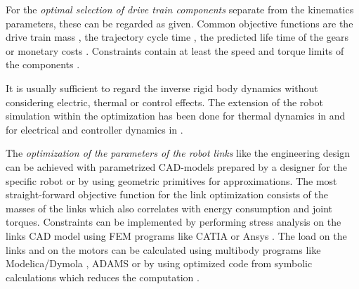 \documentclass{svproc}
\begin{document}
For the \emph{optimal selection of drive train components} separate from the kinematics parameters, these can be regarded as given. %
Common objective functions are the drive train mass \cite{ChedmailGau1990,PetterssonOel2009,ZhouBaiHan2011}, the trajectory cycle time \cite{TarkianPerOelFen2011}, the predicted life time of the gears \cite{PetterssonAndKru2005} or monetary costs \cite{PetterssonAndKru2005}.
Constraints contain at least the speed and torque limits of the components \cite {ChedmailGau1990,PetterssonOel2009,ZhouBaiHan2011}.

It is usually sufficient to regard the inverse rigid body dynamics without considering electric, thermal or control effects.
The extension of the robot simulation within the optimization has been done for thermal dynamics in \cite{ChedmailGau1990} and for electrical and controller dynamics in \cite{Padilla-GarciaCruRod2015}.


The \emph{optimization of the parameters of the robot links} like the engineering design can be achieved with parametrized CAD-models prepared by a designer for the specific robot \cite{TarkianPerOelFen2011,ZhouBai2015} or by using geometric primitives \cite{RamirezKotOrt2017} for approximations. %
The most straight-forward objective function for the link optimization consists of the masses of the links which also correlates with energy consumption and joint torques.
Constraints can be implemented by performing stress analysis on the links CAD model using FEM programs like CATIA \cite{TarkianPerOelFen2011} or Ansys \cite{ZhouBai2015}.
The load on the links and on the motors can be calculated using multibody programs like Modelica/Dymola \cite{TarkianPerOelFen2011}, ADAMS \cite{ZhouBaiHan2011} or by using optimized code from symbolic calculations \cite{ChedmailGau1990} which reduces the computation \cite{KhalilDom2002}.
\end{document}
